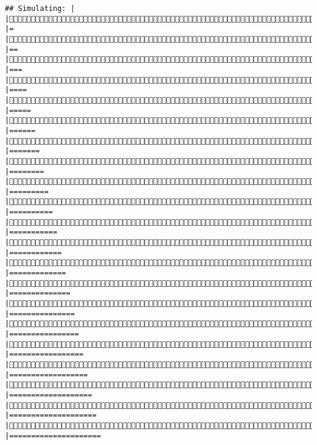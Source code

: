 \documentclass[]{article}
\begin{document}
\begin{verbatim}
## Simulating: |                                                             |Simulating: |=                                                            |Simulating: |==                                                           |Simulating: |===                                                          |Simulating: |====                                                         |Simulating: |=====                                                        |Simulating: |======                                                       |Simulating: |=======                                                      |Simulating: |========                                                     |Simulating: |=========                                                    |Simulating: |==========                                                   |Simulating: |===========                                                  |Simulating: |============                                                 |Simulating: |=============                                                |Simulating: |==============                                               |Simulating: |===============                                              |Simulating: |================                                             |Simulating: |=================                                            |Simulating: |==================                                           |Simulating: |===================                                          |Simulating: |====================                                         |Simulating: |=====================                                        
\end{verbatim}
\end{document}
